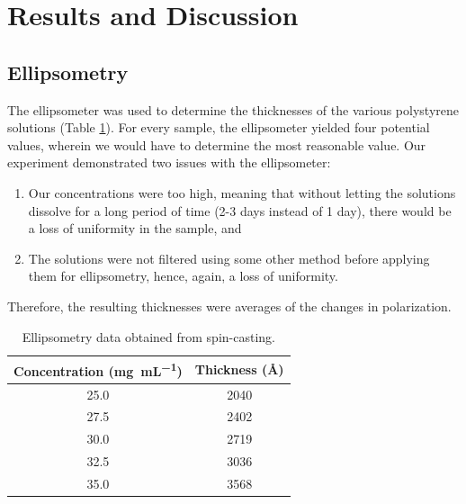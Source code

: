 \documentclass[twocolumn]{article}
\begin{document}
        \section{Results and Discussion}
            \subsection{Ellipsometry}
                The ellipsometer was used to determine the thicknesses of the various polystyrene solutions (Table \ref{tab:ellips}). For every sample, the ellipsometer yielded four potential values, wherein we would have to determine the most reasonable value. Our experiment demonstrated two issues with the ellipsometer:
                \begin{enumerate}
                    \item Our concentrations were too high, meaning that without letting the solutions dissolve for a long period of time (2-3 days instead of 1 day), there would be a loss of uniformity in the sample, and
                    \item The solutions were not filtered using some other method before applying them for ellipsometry, hence, again, a loss of uniformity.
                \end{enumerate}
                
                Therefore, the resulting thicknesses were averages of the changes in polarization.

                \begin{table}
                    \centering
                    \caption{Ellipsometry data obtained from spin-casting.}\label{tab:ellips}
                        \begin{tabular}{@{}cc@{}}
                            \toprule
                            Concentration (\unit{\milli\gram\per\milli\liter}) & Thickness (\unit{\angstrom}) \\ \midrule
                            25.0                  & 2040          \\
                            27.5                  & 2402          \\
                            30.0                  & 2719          \\
                            32.5                  & 3036          \\
                            35.0                  & 3568          \\ \bottomrule
                        \end{tabular}
                \end{table}
\end{document}
